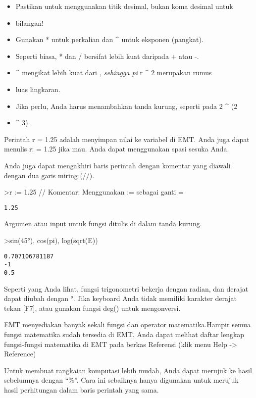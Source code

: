 \documentclass[
]{book}
\begin{document}
\begin{itemize}
\item
  Pastikan untuk menggunakan titik desimal, bukan koma desimal untuk
\item
  bilangan!
\item
  Gunakan * untuk perkalian dan \^{} untuk eksponen (pangkat).
\item
  Seperti biasa, * dan / bersifat lebih kuat daripada + atau -.
\item
  \^{} mengikat lebih kuat dari \emph{, sehingga pi } r \^{} 2 merupakan rumus
\item
  luas lingkaran.
\item
  Jika perlu, Anda harus menambahkan tanda kurung, seperti pada 2 \^{} (2
\item
  \^{} 3).
\end{itemize}

Perintah r = 1.25 adalah menyimpan nilai ke variabel di EMT. Anda juga dapat menulis r: = 1.25 jika mau. Anda dapat menggunakan spasi sesuka Anda.

Anda juga dapat mengakhiri baris perintah dengan komentar yang diawali dengan dua garis miring (//).

\textgreater r := 1.25 // Komentar: Menggunakan := sebagai ganti =

\begin{verbatim}
1.25
\end{verbatim}

Argumen atau input untuk fungsi ditulis di dalam tanda kurung.

\textgreater sin(45°), cos(pi), log(sqrt(E))

\begin{verbatim}
0.707106781187
-1
0.5
\end{verbatim}

Seperti yang Anda lihat, fungsi trigonometri bekerja dengan radian, dan derajat dapat diubah dengan °. Jika keyboard Anda tidak memiliki karakter derajat tekan {[}F7{]}, atau gunakan fungsi deg() untuk mengonversi.

EMT menyediakan banyak sekali fungsi dan operator matematika.Hampir semua fungsi matematika sudah tersedia di EMT. Anda dapat melihat daftar lengkap fungsi-fungsi matematika di EMT pada berkas Referensi (klik menu Help -\textgreater{} Reference)

Untuk membuat rangkaian komputasi lebih mudah, Anda dapat merujuk ke hasil sebelumnya dengan ``\%''. Cara ini sebaiknya hanya digunakan untuk merujuk hasil perhitungan dalam baris perintah yang sama.
\end{document}
